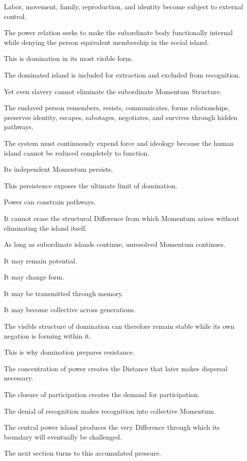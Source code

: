 Labor, movement, family, reproduction, and identity become subject to external control.

The power relation seeks to make the subordinate body functionally internal while denying the person equivalent membership in the social island.

This is domination in its most visible form.

The dominated island is included for extraction and excluded from recognition.

Yet even slavery cannot eliminate the subordinate Momentum Structure.

The enslaved person remembers, resists, communicates, forms relationships, preserves identity, escapes, sabotages, negotiates, and survives through hidden pathways.

The system must continuously expend force and ideology because the human island cannot be reduced completely to function.

Its independent Momentum persists.

This persistence exposes the ultimate limit of domination.

Power can constrain pathways.

It cannot erase the structural Difference from which Momentum arises without eliminating the island itself.

As long as subordinate islands continue, unresolved Momentum continues.

It may remain potential.

It may change form.

It may be transmitted through memory.

It may become collective across generations.

The visible structure of domination can therefore remain stable while its own negation is forming within it.

This is why domination prepares resistance.

The concentration of power creates the Distance that later makes dispersal necessary.

The closure of participation creates the demand for participation.

The denial of recognition makes recognition into collective Momentum.

The central power island produces the very Difference through which its boundary will eventually be challenged.

The next section turns to this accumulated pressure.

